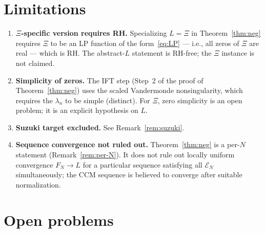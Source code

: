 \documentclass[12pt]{amsart}
\theoremstyle{definition}
\theoremstyle{remark}
\theoremstyle{plain}
\begin{document}
\section{Limitations}
\label{sec:limitations}

\begin{enumerate}[label=(\alph*)]
\item \textbf{$\Xi$-specific version requires RH.}  Specializing $L=\Xi$
  in Theorem~\ref{thm:neg} requires $\Xi$ to be an LP function of the
  form~\eqref{eq:LP} --- i.e., all zeros of $\Xi$ are real --- which is RH.
  The abstract-$L$ statement is RH-free; the $\Xi$ instance is not claimed.

\item \textbf{Simplicity of zeros.}  The IFT step (Step~2 of the proof of
  Theorem~\ref{thm:neg}) uses the scaled Vandermonde nonsingularity, which
  requires the $\lambda_n$ to be simple (distinct).  For $\Xi$, zero
  simplicity is an open problem; it is an explicit hypothesis on $L$.

\item \textbf{Suzuki target excluded.}  See Remark~\ref{rem:suzuki}.

\item \textbf{Sequence convergence not ruled out.}  Theorem~\ref{thm:neg}
  is a per-$N$ statement (Remark~\ref{rem:per-N}).  It does not rule out
  locally uniform convergence $F_N\to L$ for a particular sequence satisfying
  all $\mathcal{E}_N$ simultaneously; the CCM sequence is believed to converge
  after suitable normalization.
\end{enumerate}

\section{Open problems}
\label{sec:open}
\end{document}
